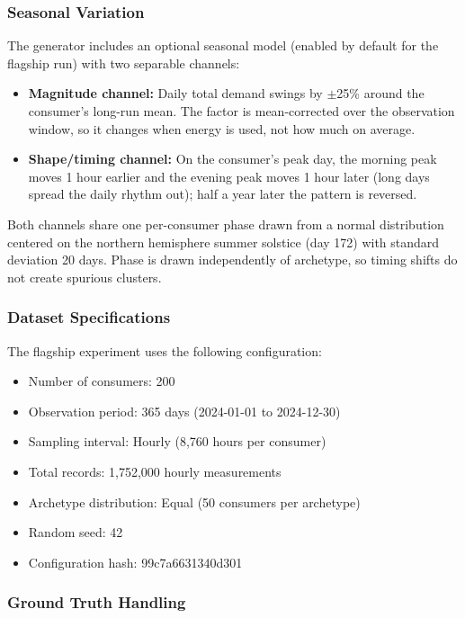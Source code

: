 \documentclass[11pt,a4paper]{article}
\begin{document}
\subsubsection{Seasonal Variation}

The generator includes an optional seasonal model (enabled by default for the flagship run) with two separable channels:

\begin{itemize}
    \item \textbf{Magnitude channel:} Daily total demand swings by $\pm$25\% around the consumer's long-run mean. The factor is mean-corrected over the observation window, so it changes when energy is used, not how much on average.
    
    \item \textbf{Shape/timing channel:} On the consumer's peak day, the morning peak moves 1 hour earlier and the evening peak moves 1 hour later (long days spread the daily rhythm out); half a year later the pattern is reversed.
\end{itemize}

Both channels share one per-consumer phase drawn from a normal distribution centered on the northern hemisphere summer solstice (day 172) with standard deviation 20 days. Phase is drawn independently of archetype, so timing shifts do not create spurious clusters.

\subsubsection{Dataset Specifications}

The flagship experiment uses the following configuration:

\begin{itemize}
    \item Number of consumers: 200
    \item Observation period: 365 days (2024-01-01 to 2024-12-30)
    \item Sampling interval: Hourly (8,760 hours per consumer)
    \item Total records: 1,752,000 hourly measurements
    \item Archetype distribution: Equal (50 consumers per archetype)
    \item Random seed: 42
    \item Configuration hash: 99c7a6631340d301
\end{itemize}

\subsubsection{Ground Truth Handling}
\end{document}
